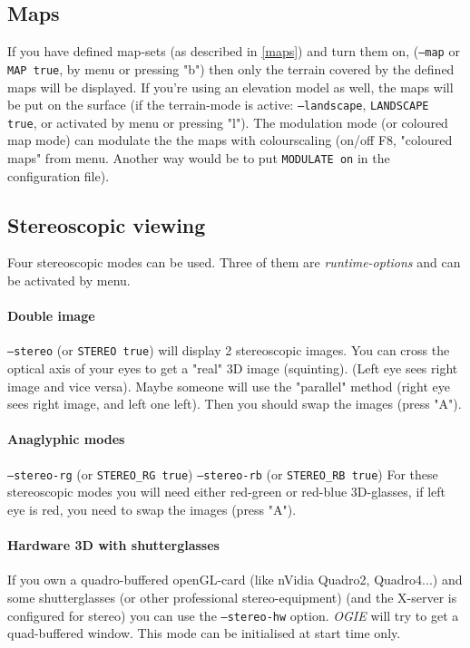 \subsection{Maps}
If you have defined map-sets (as described in \ref{maps}) and turn them on,
(\texttt{--map} or \texttt{MAP true}, by menu or pressing "b") then only the terrain covered by the
defined maps will be displayed. If you're using an elevation model as well, the
maps will be put on the surface (if the terrain-mode is active: \texttt{--landscape},
\texttt{LANDSCAPE true}, or activated by menu or pressing "l").
The modulation mode (or coloured map mode) can modulate the the maps with colourscaling (on/off F8, "coloured maps" from menu. Another way would be to put \texttt{MODULATE on} in the configuration file).




\subsection{Stereoscopic viewing}

Four stereoscopic modes can be used.
Three of them are \emph{runtime-options} and can be activated by menu.

\paragraph{Double image}
\texttt{--stereo} (or \texttt{STEREO true})
will display 2 stereoscopic images. You can cross the optical axis of your eyes
to get a "real" 3D image (squinting). (Left eye sees right image and vice versa).
Maybe someone will use the "parallel" method (right eye sees right image, and left
one left). Then you should swap the images (press "A").

\paragraph{Anaglyphic modes}
\texttt{--stereo-rg} (or \texttt{STEREO\_RG true})
\texttt{--stereo-rb} (or \texttt{STEREO\_RB true})
For these stereoscopic modes you will need either  red-green or  red-blue
3D-glasses, if left eye is red, you need to swap the images (press "A").

\paragraph{Hardware 3D with shutterglasses}
If you own a  quadro-buffered openGL-card (like nVidia Quadro2, Quadro4...) and
some shutterglasses (or other professional stereo-equipment)
(and the X-server is configured for stereo) you can use the
\texttt{--stereo-hw} option. \emph{OGIE} will try to get a quad-buffered window.
This mode can be initialised at start time only.


